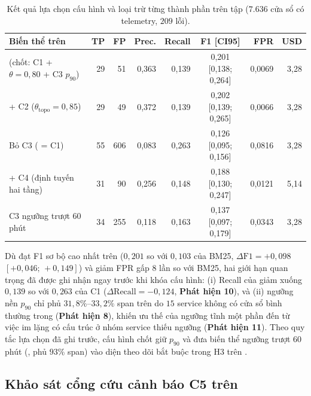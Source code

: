 \begin{table}[htbp]
  \centering
  \caption[So sánh các biến thể H3 quanh CTAV trên tập val]{Kết quả lựa chọn cấu hình \CTAV{} và loại trừ từng thành phần trên tập  ($7.636$ cửa sổ có telemetry, $209$ lỗi).}
  \label{tab:ch5-val-h3}
  \scriptsize
  \renewcommand{\arraystretch}{1.15}
  \setlength{\tabcolsep}{3pt}
  \begin{tabularx}{\linewidth}{@{}Y r r r r c r r@{}}
    \toprule
    \textbf{Biến thể trên } & \textbf{TP} & \textbf{FP} & \textbf{Prec.} & \textbf{Recall} & \textbf{F1 [CI95]} & \textbf{FPR} & \textbf{USD} \\
    \midrule
    \textbf{\CTAV{}} (chốt: C1 + $\theta = 0{,}80$ + C3  $p_{90}$) & 29 & 51 & 0,363 & 0,139 & 0,201 [0,138; 0,264] & 0,0069 & 3,28 \\
    + C2 ($\theta_{\text{topo}} = 0{,}85$) & 29 & 49 & 0,372 & 0,139 & 0,202 [0,139; 0,265] & 0,0066 & 3,28 \\
    Bỏ C3 ( = C1) & 55 & 606 & 0,083 & 0,263 & 0,126 [0,095; 0,156] & 0,0816 & 3,28 \\
    + C4 (định tuyến hai tầng) & 31 & 90 & 0,256 & 0,148 & 0,188 [0,130; 0,247] & 0,0121 & 5,14 \\
    C3 ngưỡng trượt 60 phút & 34 & 255 & 0,118 & 0,163 & 0,137 [0,097; 0,179] & 0,0343 & 3,28 \\
    \bottomrule
  \end{tabularx}
\end{table}

Dù \CTAV{} đạt F1 sơ bộ cao nhất trên  ($0{,}201$ so với $0{,}103$ của BM25, $\Delta\text{F1} = +0{,}098$ $[+0{,}046;\, +0{,}149]$) và giảm FPR gấp $8$ lần so với BM25, hai giới hạn quan trọng đã được ghi nhận ngay trước khi khóa cấu hình: (i) Recall của \CTAV{} giảm xuống $0{,}139$ so với $0{,}263$ của C1 ($\Delta\text{Recall} = -0{,}124$, \textbf{Phát hiện 10}), và (ii) ngưỡng nền  $p_{90}$ chỉ phủ $31{,}8\%$--$33{,}2\%$ span trên  do $15$ service không có cửa sổ bình thường trong  (\textbf{Phát hiện 8}), khiến ưu thế của ngưỡng tĩnh  một phần đến từ việc im lặng có cấu trúc ở nhóm service thiếu ngưỡng (\textbf{Phát hiện 11}). Theo quy tắc lựa chọn đã ghi trước, cấu hình chốt giữ  $p_{90}$ và đưa biến thể ngưỡng trượt 60 phút (, phủ $93\%$ span) vào diện theo dõi bắt buộc trong H3 trên .

\subsection{Khảo sát cổng cứu cảnh báo C5 trên }
\label{sec:ch5-c5}

